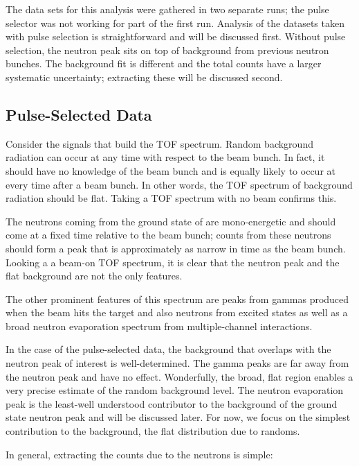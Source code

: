 The data sets for this analysis were gathered in two separate runs; the pulse selector was not working for part of the first run.  Analysis of the datasets taken with pulse selection is straightforward and will be discussed first.  Without pulse selection, the neutron peak sits on top of background from previous neutron bunches.  The background fit is different and the total counts have a larger systematic uncertainty; extracting these will be discussed second.

\subsection{Pulse-Selected Data}
Consider the signals that build the TOF spectrum.  Random background radiation can occur at any time with respect to the beam bunch.  In fact, it should have no knowledge of the beam bunch and is equally likely to occur at every time after a beam bunch.  In other words, the TOF spectrum of background radiation should be flat.  Taking a TOF spectrum with no beam confirms this.


The neutrons coming from the ground state of  are mono-energetic and should come at a fixed time relative to the beam bunch; counts from these neutrons should form a peak that is approximately as narrow in time as the beam bunch.  Looking a a beam-on TOF spectrum, it is clear that the neutron peak and the flat background are not the only features.


The other prominent features of this spectrum are peaks from gammas produced when the beam hits the target and also neutrons from excited states as well as a broad neutron evaporation spectrum from multiple-channel interactions.

In the case of the pulse-selected data, the background that overlaps with the neutron peak of interest is well-determined.  The gamma peaks are far away from the neutron peak and have no effect.  Wonderfully, the broad, flat region enables a very precise estimate of the random background level.  The neutron evaporation peak is the least-well understood contributor to the background of the ground state neutron peak and will be discussed later.  For now, we focus on the simplest contribution to the background, the flat distribution due to randoms.

In general, extracting the counts due to the neutrons is simple:


